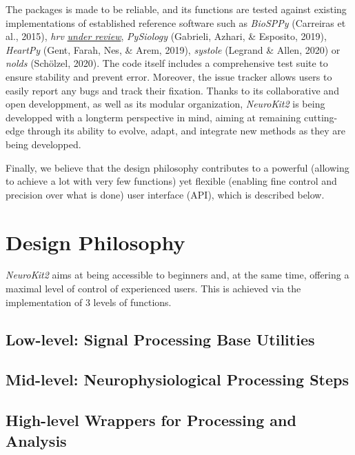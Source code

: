 \documentclass[
  english,
  man,floatsintext]{apa6}
\begin{document}
The packages is made to be reliable, and its functions are tested against existing implementations of established reference software such as \emph{BioSPPy} (Carreiras et al., 2015), \emph{hrv} \href{https://github.com/openjournals/joss-reviews/issues/1867}{\emph{under review}}, \emph{PySiology} (Gabrieli, Azhari, \& Esposito, 2019), \emph{HeartPy} (Gent, Farah, Nes, \& Arem, 2019), \emph{systole} (Legrand \& Allen, 2020) or \emph{nolds} (Schölzel, 2020). The code itself includes a comprehensive test suite to ensure stability and prevent error. Moreover, the issue tracker allows users to easily report any bugs and track their fixation. Thanks to its collaborative and open developpment, as well as its modular organization, \emph{NeuroKit2} is being developped with a longterm perspective in mind, aiming at remaining cutting-edge through its ability to evolve, adapt, and integrate new methods as they are being developped.

Finally, we believe that the design philosophy contributes to a powerful (allowing to achieve a lot with very few functions) yet flexible (enabling fine control and precision over what is done) user interface (API), which is described below.

\hypertarget{design-philosophy}{%
\section{Design Philosophy}\label{design-philosophy}}

\emph{NeuroKit2} aims at being accessible to beginners and, at the same time, offering a maximal level of control of experienced users. This is achieved via the implementation of 3 levels of functions.

\hypertarget{low-level-signal-processing-base-utilities}{%
\subsection{Low-level: Signal Processing Base Utilities}\label{low-level-signal-processing-base-utilities}}

\hypertarget{mid-level-neurophysiological-processing-steps}{%
\subsection{Mid-level: Neurophysiological Processing Steps}\label{mid-level-neurophysiological-processing-steps}}

\hypertarget{high-level-wrappers-for-processing-and-analysis}{%
\subsection{High-level Wrappers for Processing and Analysis}\label{high-level-wrappers-for-processing-and-analysis}}
\end{document}
